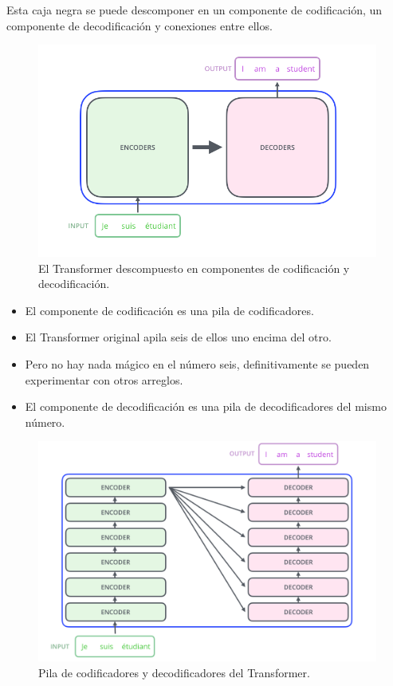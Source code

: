 Esta caja negra se puede descomponer en un componente de codificación, un componente de decodificación y conexiones entre ellos.
\begin{figure}[h]
  \centering
  \includegraphics[scale=0.29]{pics/The_transformer_encoders_decoders.png}
  \caption{El Transformer descompuesto en componentes de codificación y decodificación.}
\end{figure}
\begin{itemize}
  \item El componente de codificación es una pila de codificadores.
  \item El Transformer original apila seis de ellos uno encima del otro.
  \item Pero no hay nada mágico en el número seis, definitivamente se pueden experimentar con otros arreglos.
  \item El componente de decodificación es una pila de decodificadores del mismo número.
\end{itemize}
\begin{figure}[h]
  \centering
  \includegraphics[scale=0.2]{pics/The_transformer_encoder_decoder_stack.png}
  \caption{Pila de codificadores y decodificadores del Transformer.}
\end{figure}
